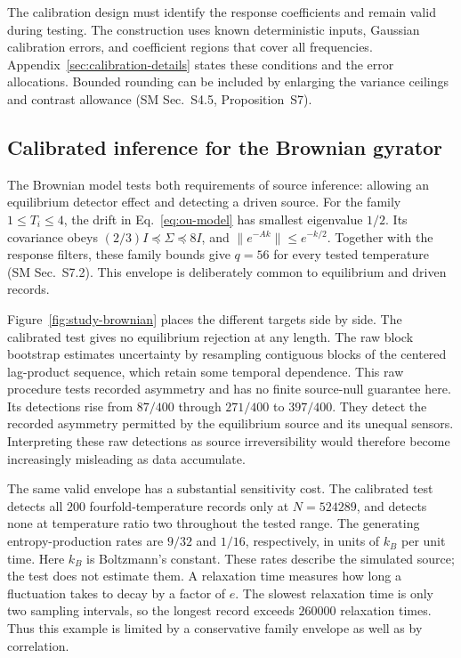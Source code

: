 The calibration design must identify the response coefficients and remain valid during testing. The construction uses known deterministic inputs, Gaussian calibration errors, and coefficient regions that cover all frequencies. Appendix~\ref{sec:calibration-details} states these conditions and the error allocations. Bounded rounding can be included by enlarging the variance ceilings and contrast allowance (SM Sec.~S4.5, Proposition~S7).

\subsection{Calibrated inference for the Brownian gyrator}\label{sec:physical}
The Brownian model tests both requirements of source inference: allowing an equilibrium detector effect and detecting a driven source. For the family $1\le T_i\le4$, the drift in Eq.~\eqref{eq:ou-model} has smallest eigenvalue $1/2$. Its covariance obeys $(2/3)I\preceq\Sigma\preceq8I$, and $\|e^{-Ak}\|\le e^{-k/2}$. Together with the response filters, these family bounds give $q=56$ for every tested temperature (SM Sec.~S7.2). This envelope is deliberately common to equilibrium and driven records.

Figure~\ref{fig:study-brownian} places the different targets side by side. The calibrated test gives no equilibrium rejection at any length. The raw block bootstrap estimates uncertainty by resampling contiguous blocks of the centered lag-product sequence, which retain some temporal dependence. This raw procedure tests recorded asymmetry and has no finite source-null guarantee here. Its detections rise from $87/400$ through $271/400$ to $397/400$. They detect the recorded asymmetry permitted by the equilibrium source and its unequal sensors. Interpreting these raw detections as source irreversibility would therefore become increasingly misleading as data accumulate.

The same valid envelope has a substantial sensitivity cost. The calibrated test detects all $200$ fourfold-temperature records only at $N=524289$, and detects none at temperature ratio two throughout the tested range. The generating entropy-production rates are $9/32$ and $1/16$, respectively, in units of $k_B$ per unit time. Here $k_B$ is Boltzmann's constant. These rates describe the simulated source; the test does not estimate them. A relaxation time measures how long a fluctuation takes to decay by a factor of $e$. The slowest relaxation time is only two sampling intervals, so the longest record exceeds $260000$ relaxation times. Thus this example is limited by a conservative family envelope as well as by correlation.

